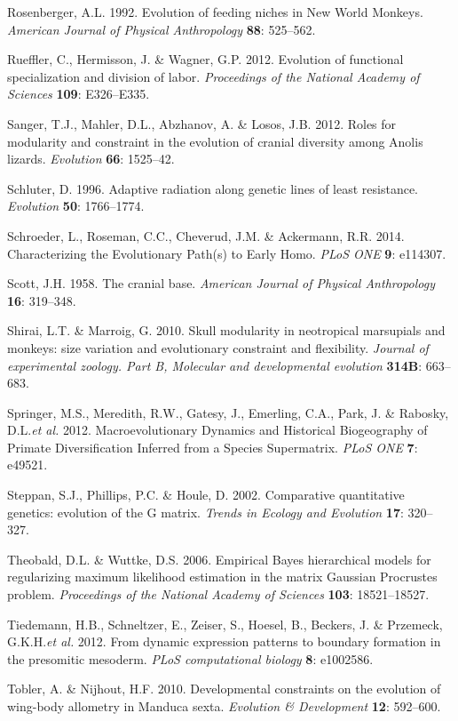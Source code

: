 \documentclass[12pt,twoside]{report}
\begin{document}
Rosenberger, A.L. 1992. Evolution of feeding niches in New World
Monkeys. \emph{American Journal of Physical Anthropology} \textbf{88}:
525--562.

Rueffler, C., Hermisson, J. \& Wagner, G.P. 2012. Evolution of
functional specialization and division of labor. \emph{Proceedings of
the National Academy of Sciences} \textbf{109}: E326--E335.

Sanger, T.J., Mahler, D.L., Abzhanov, A. \& Losos, J.B. 2012. Roles for
modularity and constraint in the evolution of cranial diversity among
Anolis lizards. \emph{Evolution} \textbf{66}: 1525--42.

Schluter, D. 1996. Adaptive radiation along genetic lines of least
resistance. \emph{Evolution} \textbf{50}: 1766--1774.

Schroeder, L., Roseman, C.C., Cheverud, J.M. \& Ackermann, R.R. 2014.
Characterizing the Evolutionary Path(s) to Early Homo. \emph{PLoS ONE}
\textbf{9}: e114307.

Scott, J.H. 1958. The cranial base. \emph{American Journal of Physical
Anthropology} \textbf{16}: 319--348.

Shirai, L.T. \& Marroig, G. 2010. Skull modularity in neotropical
marsupials and monkeys: size variation and evolutionary constraint and
flexibility. \emph{Journal of experimental zoology. Part B, Molecular
and developmental evolution} \textbf{314B}: 663--683.

Springer, M.S., Meredith, R.W., Gatesy, J., Emerling, C.A., Park, J. \&
Rabosky, D.L.\emph{et al.} 2012. Macroevolutionary Dynamics and
Historical Biogeography of Primate Diversification Inferred from a
Species Supermatrix. \emph{PLoS ONE} \textbf{7}: e49521.

Steppan, S.J., Phillips, P.C. \& Houle, D. 2002. Comparative
quantitative genetics: evolution of the G matrix. \emph{Trends in
Ecology and Evolution} \textbf{17}: 320--327.

Theobald, D.L. \& Wuttke, D.S. 2006. Empirical Bayes hierarchical models
for regularizing maximum likelihood estimation in the matrix Gaussian
Procrustes problem. \emph{Proceedings of the National Academy of
Sciences} \textbf{103}: 18521--18527.

Tiedemann, H.B., Schneltzer, E., Zeiser, S., Hoesel, B., Beckers, J. \&
Przemeck, G.K.H.\emph{et al.} 2012. From dynamic expression patterns to
boundary formation in the presomitic mesoderm. \emph{PLoS computational
biology} \textbf{8}: e1002586.

Tobler, A. \& Nijhout, H.F. 2010. Developmental constraints on the
evolution of wing-body allometry in Manduca sexta. \emph{Evolution \&
Development} \textbf{12}: 592--600.
\end{document}
